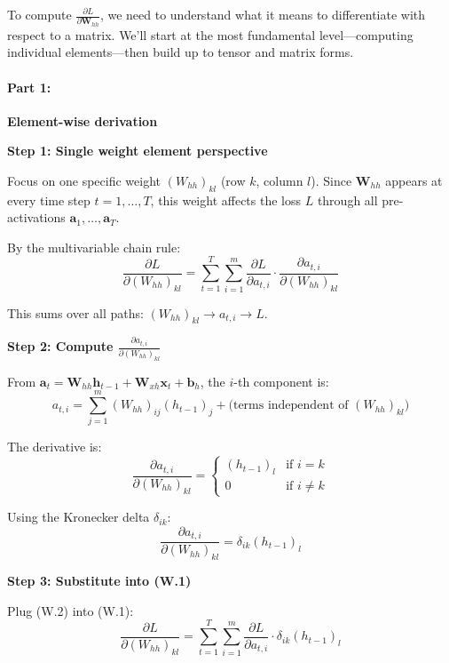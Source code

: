 \begin{notechapter}
To compute $\frac{\partial L}{\partial \mathbf{W}_{hh}}$, we need to understand
what it means to differentiate with respect to a matrix. We'll start at the most
fundamental level—computing individual elements—then build up to tensor and
matrix forms.

\paragraph{Part 1:}\textbf{Element-wise derivation}

\vspace{1em}
\textbf{Step 1: Single weight element perspective}
\vspace{1em}

Focus on one specific weight $(W_{hh})_{kl}$ (row $k$, column $l$). Since
$\mathbf{W}_{hh}$ appears at every time step $t = 1, \dots, T$, this weight
affects the loss $L$ through all pre-activations $\mathbf{a}_1, \dots,
\mathbf{a}_T$.

By the multivariable chain rule:
\[
\frac{\partial L}{\partial (W_{hh})_{kl}} = \sum_{t=1}^{T} \sum_{i=1}^{m} \frac{\partial L}{\partial a_{t,i}} \cdot \frac{\partial a_{t,i}}{\partial (W_{hh})_{kl}}
\tag{W.1}
\]

This sums over all paths: $(W_{hh})_{kl} \rightarrow a_{t,i} \rightarrow L$.

\vspace{1em}
\textbf{Step 2: Compute $\frac{\partial a_{t,i}}{\partial (W_{hh})_{kl}}$}
\vspace{1em}

From $\mathbf{a}_t = \mathbf{W}_{hh} \mathbf{h}_{t-1} + \mathbf{W}_{xh}
\mathbf{x}_t + \mathbf{b}_h$, the $i$-th component is:
\[
a_{t,i} = \sum_{j=1}^{m} (W_{hh})_{ij} (h_{t-1})_j + \text{(terms independent of $(W_{hh})_{kl}$)}
\]

The derivative is:
\[
\frac{\partial a_{t,i}}{\partial (W_{hh})_{kl}} = 
\begin{cases}
(h_{t-1})_l & \text{if } i = k \\
0 & \text{if } i \neq k
\end{cases}
\]

Using the Kronecker delta $\delta_{ik}$:
\[
\frac{\partial a_{t,i}}{\partial (W_{hh})_{kl}} = \delta_{ik} (h_{t-1})_l
\tag{W.2}
\]

\vspace{1em}
\textbf{Step 3: Substitute into (W.1)}
\vspace{1em}

Plug (W.2) into (W.1):
\[
\frac{\partial L}{\partial (W_{hh})_{kl}} =
\sum_{t=1}^{T} \sum_{i=1}^{m} \frac{\partial L}{\partial a_{t,i}}
\cdot \delta_{ik} (h_{t-1})_l
\]


\end{notechapter}
